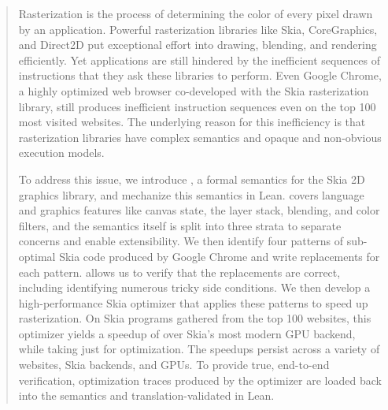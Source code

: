 \begin{abstract}
Rasterization is the process of determining
  the color of every pixel drawn by an application.
Powerful rasterization libraries
  like Skia, CoreGraphics, and Direct2D
  put exceptional effort into drawing, blending, and rendering efficiently.
Yet applications are still hindered
  by the inefficient sequences of instructions
  that they ask these libraries to perform.
Even Google Chrome, a highly optimized web browser
  co-developed with the Skia rasterization library,
  still produces inefficient instruction sequences
  even on the top 100 most visited websites.
The underlying reason for this inefficiency
  is that rasterization libraries have complex semantics
  and opaque and non-obvious execution models.

To address this issue, we introduce \muskia,
  a formal semantics for the Skia 2D graphics library,
  and mechanize this semantics in Lean.
\muskia covers language and graphics features
  like canvas state, the layer stack, blending, and color filters,
  and the semantics itself is split into three strata
  to separate concerns and enable extensibility.
We then identify four patterns
  of sub-optimal Skia code produced by Google Chrome
  and write replacements for each pattern.
\muskia allows us to verify that the replacements are correct,
  including identifying numerous tricky side conditions.
We then develop a high-performance Skia optimizer
  that applies these patterns to speed up rasterization.
On \graphiteAppleNumBench Skia programs
  gathered from the top 100 websites,
  this optimizer yields a speedup of \graphiteAppleGeoSpeedup
  over Skia's most modern GPU backend,
  while taking just \graphiteAppleMaxOptTime for optimization.
The speedups persist across a variety of
  websites, Skia backends, and GPUs.
To provide true, end-to-end verification,
  optimization traces produced by the optimizer
  are loaded back into the \muskia semantics and translation-validated in Lean.
\end{abstract}
